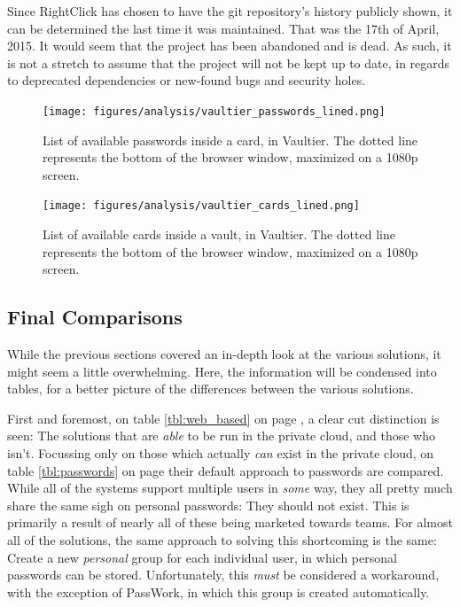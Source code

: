 			Since RightClick has chosen to have the git repository's history publicly shown, it can be determined the last time it was maintained. That was the 17th of April, 2015\cite{vaultier_history}. It would seem that the project has been abandoned and is dead. As such, it is not a stretch to assume that the project will not be kept up to date, in regards to deprecated dependencies or new-found bugs and security holes.



			\begin{figure}[htbp]
				\centering
				\texttt{[image: figures/analysis/vaultier\_passwords\_lined.png]}
				\caption{List of available passwords inside a card, in Vaultier. The dotted line represents the bottom of the browser window, maximized on a 1080p screen.}
				\label{fig:vaultier_passwords}
			\end{figure}
			\begin{figure}[htbp]
				\centering
				\texttt{[image: figures/analysis/vaultier\_cards\_lined.png]}
				\caption{List of available cards inside a vault, in Vaultier. The dotted line represents the bottom of the browser window, maximized on a 1080p screen.}
				\label{fig:vaultier_cards}
			\end{figure}

		\subsection{Final Comparisons}
			\newcommand{\red}[1]{\cellcolor{red!75}#1}
			\newcommand{\green}[1]{\cellcolor{green!75}#1}
			\newcommand{\grey}[1]{\cellcolor{gray!75}#1}
			\newcommand{\yellow}[1]{\cellcolor{yellow!75}#1}


			While the previous sections covered an in-depth look at the various solutions, it might seem a little overwhelming. Here, the information will be condensed into tables, for a better picture of the differences between the various solutions.

			First and foremost, on table \ref{tbl:web_based} on page \pageref{tbl:web_based}, a clear cut distinction is seen: The solutions that are \emph{able} to be run in the private cloud, and those who isn't. Focussing only on those which actually \emph{can} exist in the private cloud, on table \ref{tbl:passwords} on page \pageref{tbl:passwords} their default approach to passwords are compared. While all of the systems support multiple users in \emph{some} way, they all pretty much share the same sigh on personal passwords: They should not exist. This is primarily a result of nearly all of these being marketed towards teams. For almost all of the solutions, the same approach to solving this shortcoming is the same: Create a new \emph{personal} group for each individual user, in which personal passwords can be stored. Unfortunately, this \emph{must} be considered a workaround, with the exception of PassWork, in which this group is created automatically. 

